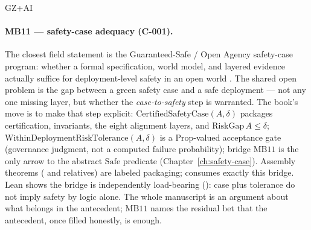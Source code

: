 \begin{authbar}{GZ+AI}
\paragraph{MB11 --- safety-case adequacy (C-001).}
The closest field statement is the Guaranteed-Safe / Open Agency safety-case program: whether a formal specification, world model, and layered evidence actually suffice for deployment-level safety in an open world \autocite{dalrymple2024gsai}.
The shared open problem is the gap between a green safety case and a safe deployment --- not any one missing layer, but whether the \emph{case-to-safety} step is warranted.
The book's move is to make that step explicit: \(\mathrm{CertifiedSafetyCase}(A,\delta)\) packages certification, invariants, the eight alignment layers, and \(\mathrm{RiskGap}\,A \le \delta\); \(\mathrm{WithinDeploymentRiskTolerance}(A,\delta)\) is a \(\mathrm{Prop}\)-valued acceptance gate (governance judgment, not a computed failure probability); bridge \(\text{MB11}\) is the only arrow to the abstract \(\mathrm{Safe}\) predicate (Chapter~\ref{ch:safety-case}).
Assembly theorems ( and relatives) are labeled packaging;  consumes exactly this bridge.
Lean shows the bridge is independently load-bearing (): case plus tolerance do not imply safety by logic alone.
The whole manuscript is an argument about what belongs in the antecedent; \(\text{MB11}\) names the residual bet that the antecedent, once filled honestly, is enough.

\end{authbar}
\authbarneedspace
